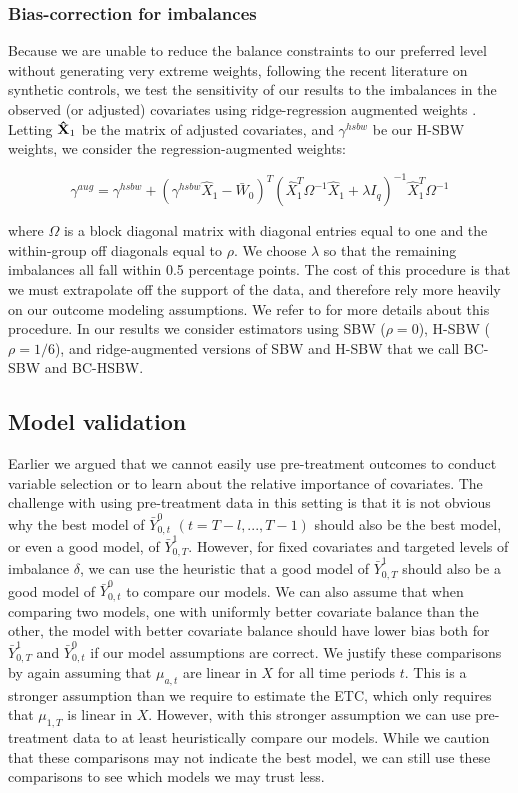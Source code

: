 \subsubsection{Bias-correction for imbalances}

Because we are unable to reduce the balance constraints to our preferred level without generating very extreme weights, following the recent literature on synthetic controls, we test the sensitivity of our results to the imbalances in the observed (or adjusted) covariates using ridge-regression augmented weights \cite{ben2018augmented}. Letting $\mathbf{\hat{X}}_1$ be the matrix of adjusted covariates, and $\gamma^{hsbw}$ be our H-SBW weights, we consider the regression-augmented weights:

\begin{equation}
\gamma^{aug} = \gamma^{hsbw} + (\gamma^{hsbw}\hat{X}_1 - \bar{W}_0)^T(\hat{X}_1^T\Omega^{-1}\hat{X}_1 + \lambda I_q)^{-1}\hat{X}_1^T\Omega^{-1}
\end{equation}

where $\Omega$ is a block diagonal matrix with diagonal entries equal to one and the within-group off diagonals equal to $\rho$. We choose $\lambda$ so that the remaining imbalances all fall within 0.5 percentage points. The cost of this procedure is that we must extrapolate off the support of the data, and therefore rely more heavily on our outcome modeling assumptions. We refer to \cite{ben2018augmented} for more details about this procedure. In our results we consider estimators using SBW ($\rho = 0$), H-SBW ($\rho = 1/6$), and ridge-augmented versions of SBW and H-SBW that we call BC-SBW and BC-HSBW. 

\subsection{Model validation}

Earlier we argued that we cannot easily use pre-treatment outcomes to conduct variable selection or to learn about the relative importance of covariates. The challenge with using pre-treatment data in this setting is that it is not obvious why the best model of $\bar{Y}_{0, t}^0$ $(t = T-l,..., T-1)$ should also be the best model, or even a good model, of $\bar{Y}^1_{0,T}$. However, for fixed covariates and targeted levels of imbalance $\delta$, we can use the heuristic that a good model of $\bar{Y}^1_{0,T}$ should also be a good model of $\bar{Y}_{0, t}^0$ to compare our models. We can also assume that when comparing two models, one with uniformly better covariate balance than the other, the model with better covariate balance should have lower bias both for $\bar{Y}_{0, T}^1$ and $\bar{Y}_{0, t}^0$ if our model assumptions are correct. We justify these comparisons by again assuming that $\mu_{a, t}$ are linear in $X$ for all time periods $t$. This is a stronger assumption than we require to estimate the ETC, which only requires that $\mu_{1, T}$ is linear in $X$. However, with this stronger assumption we can use pre-treatment data to at least heuristically compare our models. While we caution that these comparisons may not indicate the best model, we can still use these comparisons to see which models we may trust less.

